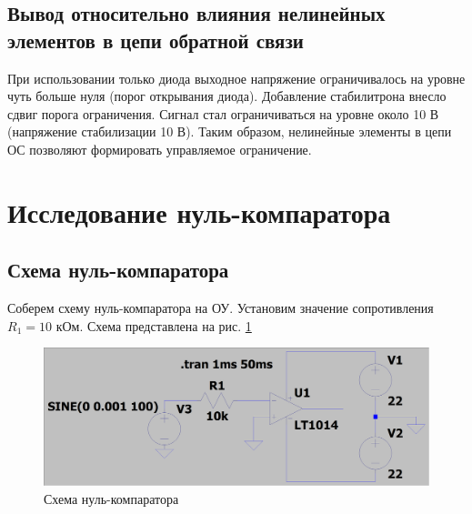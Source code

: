 \documentclass[a4paper, 12pt]{article}
\begin{document}
    \subsection{Вывод относительно влияния нелинейных элементов в цепи обратной связи}
    При использовании только диода выходное напряжение ограничивалось на уровне чуть больше нуля
    (порог открывания диода). Добавление стабилитрона внесло сдвиг порога ограничения. Сигнал
    стал ограничиваться на уровне около 10 В (напряжение стабилизации 10 В). Таким образом,
    нелинейные элементы в цепи ОС позволяют формировать управляемое ограничение.


    \section{Исследование нуль-компаратора}
    \subsection{Схема нуль-компаратора}
    Соберем схему нуль-компаратора на ОУ. Установим
    значение сопротивления $R_1=10$ кОм. Схема
    представлена на рис. \ref{fig:scheme5}
    \begin{figure}[H]
        \centering
        \includegraphics[scale=0.22]{scheme5.png}
        \captionsetup{skip=0pt}
        \caption{Схема нуль-компаратора}
        \label{fig:scheme5}
    \end{figure}
\end{document}
